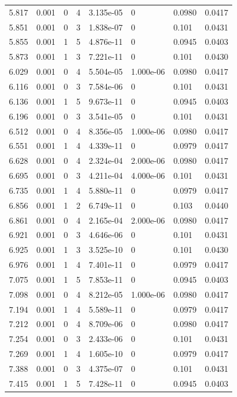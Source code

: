 \documentclass[preview]{standalone}
\begin{document}
{{{\begin{tabular}{L{1.2cm}C{1.2cm} C{0.3cm}C{0.5cm} C{1.4cm}C{1.4cm} C{1.4cm}C{1.4cm}}
  5.817  &  0.001  & 0     &  4 &  3.135e-05  & 0  & 0.0980 &  0.0417   \\ 
  5.851  &  0.001  & 0     &  3 &  1.838e-07  & 0  & 0.101 &  0.0431   \\ 
  5.855  &  0.001  & 1     &  5 &  4.876e-11  & 0  & 0.0945 &  0.0403   \\ 
  5.873  &  0.001  & 1     &  3 &  7.221e-11  & 0  & 0.101 &  0.0430   \\ 
  6.029  &  0.001  & 0     &  4 &  5.504e-05  & 1.000e-06  & 0.0980 &  0.0417   \\ 
  6.116  &  0.001  & 0     &  3 &  7.584e-06  & 0  & 0.101 &  0.0431   \\ 
  6.136  &  0.001  & 1     &  5 &  9.673e-11  & 0  & 0.0945 &  0.0403   \\ 
  6.196  &  0.001  & 0     &  3 &  3.541e-05  & 0  & 0.101 &  0.0431   \\ 
  6.512  &  0.001  & 0     &  4 &  8.356e-05  & 1.000e-06  & 0.0980 &  0.0417   \\ 
  6.551  &  0.001  & 1     &  4 &  4.339e-11  & 0  & 0.0979 &  0.0417   \\ 
  6.628  &  0.001  & 0     &  4 &  2.324e-04  & 2.000e-06  & 0.0980 &  0.0417   \\ 
  6.695  &  0.001  & 0     &  3 &  4.211e-04  & 4.000e-06  & 0.101 &  0.0431   \\ 
  6.735  &  0.001  & 1     &  4 &  5.880e-11  & 0  & 0.0979 &  0.0417   \\ 
  6.856  &  0.001  & 1     &  2 &  6.749e-11  & 0  & 0.103 &  0.0440   \\ 
  6.861  &  0.001  & 0     &  4 &  2.165e-04  & 2.000e-06  & 0.0980 &  0.0417   \\ 
  6.921  &  0.001  & 0     &  3 &  4.646e-06  & 0  & 0.101 &  0.0431   \\ 
  6.925  &  0.001  & 1     &  3 &  3.525e-10  & 0  & 0.101 &  0.0430   \\ 
  6.976  &  0.001  & 1     &  4 &  7.401e-11  & 0  & 0.0979 &  0.0417   \\ 
  7.075  &  0.001  & 1     &  5 &  7.853e-11  & 0  & 0.0945 &  0.0403   \\ 
  7.098  &  0.001  & 0     &  4 &  8.212e-05  & 1.000e-06  & 0.0980 &  0.0417   \\ 
  7.194  &  0.001  & 1     &  4 &  5.589e-11  & 0  & 0.0979 &  0.0417   \\ 
  7.212  &  0.001  & 0     &  4 &  8.709e-06  & 0  & 0.0980 &  0.0417   \\ 
  7.254  &  0.001  & 0     &  3 &  2.433e-06  & 0  & 0.101 &  0.0431   \\ 
  7.269  &  0.001  & 1     &  4 &  1.605e-10  & 0  & 0.0979 &  0.0417   \\ 
  7.388  &  0.001  & 0     &  3 &  4.375e-07  & 0  & 0.101 &  0.0431   \\ 
  7.415  &  0.001  & 1     &  5 &  7.428e-11  & 0  & 0.0945 &  0.0403   \\ 
\hline 
\end{tabular} 

}}}
\end{document}
